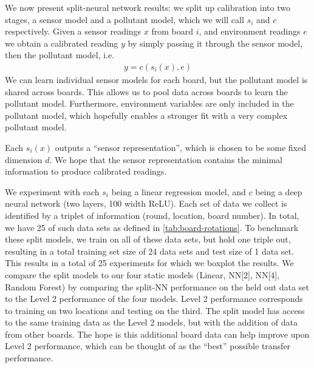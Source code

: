 \documentclass[journal abbreviation, manuscript]{copernicus}
\begin{document}
We now present split-neural network results: we split
up calibration into two stages, a sensor model
and a pollutant model, which we will call $s_i$ and $c$
respectively.
Given a sensor readings $x$ from board $i$,
and environment readings $e$
we obtain a calibrated reading $y$ by simply passing it through
the sensor model, then the pollutant model, i.e.
\begin{align*}
    y = c(s_i(x), e)
\end{align*}
We can learn individual sensor models for each board,
but the pollutant model is shared across boards. This allows
us to pool data across boards to learn the pollutant model.
Furthermore, environment variables are only 
included in the pollutant model, which hopefully enables
a stronger fit with a very complex pollutant model.

Each $s_i(x)$ outputs a ``sensor representation'', which is chosen
to be some fixed dimension $d$. We hope that the sensor representation
contains the minimal information to produce calibrated readings.

We experiment with each $s_i$ being a linear regression model,
and $c$ being a deep neural network (two layers, 100 width ReLU). 
Each set of data we collect
is identified by a triplet of information (round, location, board number). In total, we have 25 of such data sets as defined in \autoref{tab:board-rotations}. To benchmark these split models, we train on all of these data sets, but
hold one triple out, resulting in a
total training set size of 24 data sets and test size of 1 data set. This results in a total of 25 experiments
for which we boxplot the results.
We compare the split models to our four static models (Linear, NN[2], NN[4], Random Forest) by comparing the split-NN performance on the held out data set to the Level 2 performance of the four models.
Level 2 performance corresponds to training on two locations
and testing on the third. The split model has access to the same training data as the Level 2 models, but with the addition of data from other boards. The hope is this additional board data can help improve upon Level 2 performance, which can be thought of as the ``best'' possible transfer performance.
\end{document}
